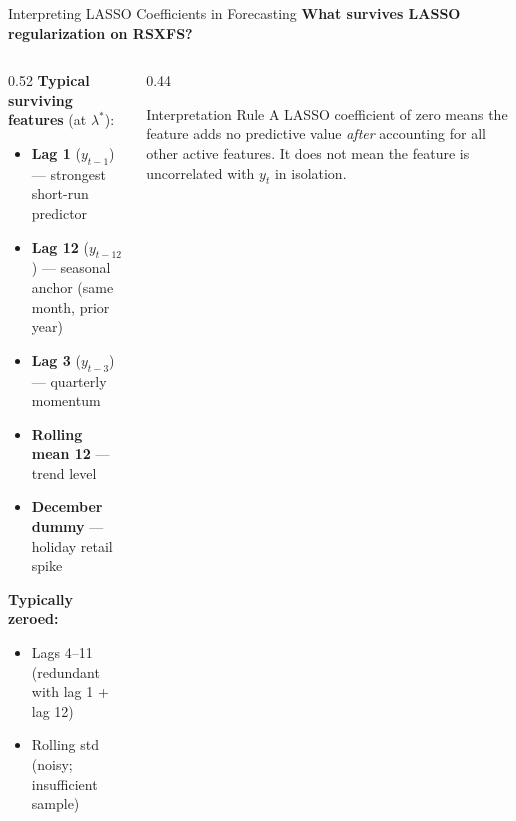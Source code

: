 \documentclass[aspectratio=169, 10pt]{beamer}
\begin{document}
\begin{frame}{Interpreting LASSO Coefficients in Forecasting}
  \textbf{What survives LASSO regularization on RSXFS?}

  \begin{columns}[T]
    \begin{column}{0.52\textwidth}
      \textbf{Typical surviving features} (at $\lambda^*$):
      \begin{itemize}
        \item \textbf{Lag 1} ($y_{t-1}$) — strongest short-run predictor
        \item \textbf{Lag 12} ($y_{t-12}$) — seasonal anchor (same month, prior year)
        \item \textbf{Lag 3} ($y_{t-3}$) — quarterly momentum
        \item \textbf{Rolling mean 12} — trend level
        \item \textbf{December dummy} — holiday retail spike
      \end{itemize}

      \medskip
      \textbf{Typically zeroed:}
      \begin{itemize}
        \item Lags 4--11 (redundant with lag 1 + lag 12)
        \item Rolling std (noisy; insufficient sample)
      \end{itemize}
    \end{column}
    \begin{column}{0.44\textwidth}
      \begin{examplebox}{Interpretation Rule}
        A LASSO coefficient of zero means the feature adds no predictive
        value \emph{after} accounting for all other active features.
        It does not mean the feature is uncorrelated with $y_t$
        in isolation.
      \end{examplebox}

      \medskip
    \end{column}
  \end{columns}
\end{frame}
\end{document}
